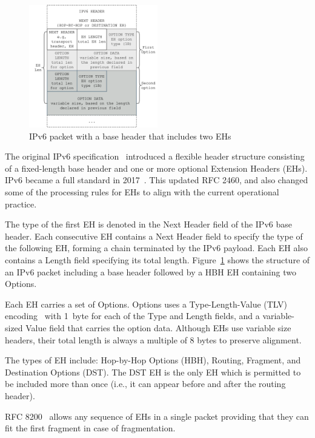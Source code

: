 \documentclass[conference]{IEEEtran}
\begin{document}
\begin{figure}
\centering
  \includegraphics[width=0.5\textwidth]{ehformat.png}
  \caption{IPv6 packet with a base header that includes two EHs}
  \label{fig:eh-format}
\end{figure}


The original IPv6 specification~\cite{rfc2460} introduced a flexible header structure consisting of a
fixed-length base header and one or more optional Extension Headers (EHs). IPv6 became a full standard in 2017~\cite{RFC8200}. This updated RFC 2460, and also changed some of the processing rules for EHs to align with the current operational practice.

The type of the first EH is denoted in the Next Header field of the IPv6 base header. Each consecutive EH contains a Next Header field to specify the type of the following EH, forming a chain terminated by the IPv6 payload. Each EH also contains a Length field specifying its total length. Figure~\ref{fig:eh-format} shows the structure of an IPv6 packet including a base header followed by a HBH EH containing two Options.

Each EH carries a set of Options. Options uses a Type-Length-Value (TLV) encoding~\cite{RFC8200} with 1~byte for each of the Type and Length fields, and a variable-sized Value field that carries the option data. Although EHs use variable size headers, their total length is always a multiple of 8 bytes to preserve alignment.

The types of EH include: Hop-by-Hop Options (HBH), Routing, Fragment, and
Destination Options (DST). The DST EH is the only EH which is permitted to be included more than once (i.e., it can appear before and after the routing header).

RFC 8200~\cite{RFC8200} allows any sequence of EHs in a single packet providing that they can fit the first fragment in case of fragmentation.
\end{document}
